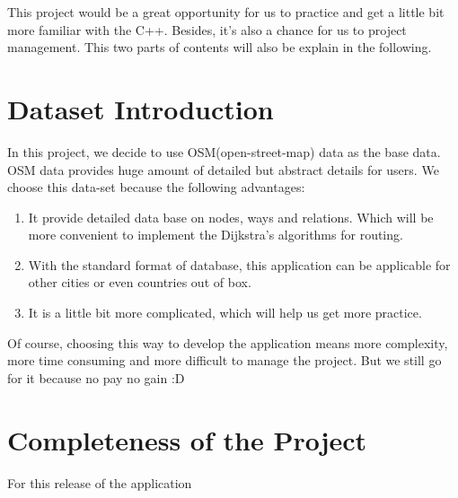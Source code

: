\documentclass[a4paper, 12pt, english]{book}
\begin{document}
This project would be a great opportunity for us to practice and get a little bit more familiar with the C++. Besides, it's also a chance for us to project management. This two parts of contents will also be explain in the following.



\section{Dataset Introduction}

In this project, we decide to use OSM(open-street-map) data as the base data. OSM data provides huge amount of detailed but abstract details for users. We choose this data-set because the following advantages:

\begin{enumerate}
	\item It provide detailed data base on nodes, ways and relations. Which will be more convenient to implement the Dijkstra's algorithms for routing.
	\item With the standard format of database, this application can be applicable for other cities or even countries out of box.
	\item It is a little bit more complicated, which will help us get more practice.
\end{enumerate}

Of course, choosing this way to develop the application means more complexity, more time consuming and more difficult to manage the project. But we still go for it because no pay no gain :D

\section{Completeness of the Project}

For this release of the application
\end{document}
